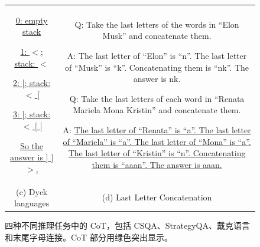 \begin{figure}[!t]
\begin{tabular}{@{}c@{\hspace{0.02\textwidth}}c@{}}
\begin{tcolorbox}[
  breakable=false,
  width=0.45\textwidth,
  height=9cm,
  valign=top
]
{\uline{0: empty stack}

\vspace{0.1em}

\uline{1: $<$; stack: $<$}

\vspace{0.1em}

\uline{2: $[$; stack: $<$ $[$}

\vspace{0.1em}

\uline{3: $[$; stack: $<$ $[$ $[$}

\vspace{0.1em}

\uline{So the answer is $]$ $]$ $>$.}

\par}
\end{tcolorbox}

&

\begin{tcolorbox}[
  breakable=false,
  width=0.45\textwidth,
  height=9cm,
  valign=top
]
{\footnotesize
Q: Take the last letters of the words in
``Elon Musk'' and concatenate them.

\vspace{0.2em}

A: \textcolor[RGB]{154,245,175}{
The last letter of ``Elon'' is ``n''.
The last letter of ``Musk'' is ``k''.
Concatenating them is ``nk''.
}
The answer is nk.

\vspace{0.5em}

Q: Take the last letters of each word in
``Renata Mariela Mona Kristin'' and concatenate them.

\vspace{0.2em}

A: \textcolor[RGB]{154,245,175}{\uline{
The last letter of ``Renata'' is ``a''.
The last letter of ``Mariela'' is ``a''.
The last letter of ``Mona'' is ``a''.
The last letter of ``Kristin'' is ``n''.
Concatenating them is ``aaan''.
}}
\uline{The answer is aaan.}

\par}
\end{tcolorbox}

\\[-0.2em]

{\small (c) Dyck languages}
&
{\small (d) Last Letter Concatenation}

\end{tabular}

\caption{四种不同推理任务中的 CoT，包括 CSQA、StrategyQA、戴克语言和末尾字母连接。CoT 部分用绿色突出显示。}
\label{fig:cot-application-examples}
\end{figure}